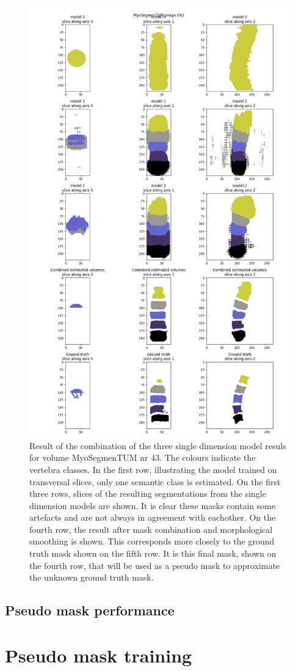 \begin{figure}
    \centering
    \includegraphics[width=.95\textwidth]{images/morphmask_denoise2_erode2_MyoSegmenTUM_043.png}
    \caption{
        Result of the combination of the three single dimension model resuls for volume MyoSegmenTUM nr 43.
        The colours indicate the vertebra classes. In the first row, illustrating the model trained on transversal slices, only one semantic class is estimated.
        On the first three rows, slices of the resulting segmentations from the single dimension models are shown. 
        It is clear these masks contain some artefacts and are not always in agreement with eachother.
        On the fourth row, the result after mask combination and morphological smoothing is shown. 
        This corresponds more closely to the ground truth mask shown on the fifth row.
        It is this final mask, shown on the fourth row, that will be used as a pseudo mask to approximate the unknown ground truth mask.
    }
\end{figure}

\section{Pseudo mask performance}

\chapter{Pseudo mask training}